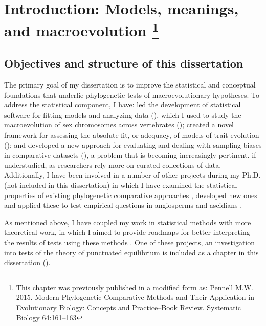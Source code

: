 \chapter[Introduction: Models, meanings, and macroevolution]{Introduction: Models, meanings, and macroevolution \footnote {This chapter was previously published in a modified form as: Pennell M.W. 2015. Modern Phylogenetic Comparative Methods and Their Application in Evolutionary Biology: Concepts and Practice--Book Review. Systematic Biology 64:161--163}}
\label{chap:introduction}

\section{Objectives and structure of this dissertation}

The primary goal of my dissertation is to improve the statistical and conceptual foundations that underlie phylogenetic tests of macroevolutionary hypotheses. To address the statistical component, I have: led the development of statistical software for fitting models and analyzing data (), which I used to study the macroevolution of sex chromosomes across vertebrates (); created a novel framework for assessing the  absolute fit, or adequacy, of models of trait evolution (); and developed a new approach for evaluating and dealing with sampling biases in comparative datasets (), a problem that is becoming increasingly pertinent. if understudied, as researchers rely more on curated collections of data. Additionally, I have been involved in a number of other projects during my Ph.D. (not included in this dissertation) in which I have examined the statistical properties of existing phylogenetic comparative approaches \citep{Pennell2012, UyedaPCA, Sarverprior}, developed new ones \citep{SlaterPennell, ksi} and applied these to test empirical questions in angiosperms \citep{ksi, nestedradiations} and ascidians \citep{Maliska2013}.

As mentioned above, I have coupled my work in statistical methods with more theoretical work, in which I aimed to provide roadmaps for better interpreting the results of tests using these methods \citep{Rosenblum2012, PennellHarmon, PennellPE, PennellTREEresponse, Pennellpcmbook}. One of these projects, an investigation into tests of the theory of punctuated equilibrium \citep{Eldredge1971, EldredgeGould1972} is included as a chapter in this dissertation (). 

